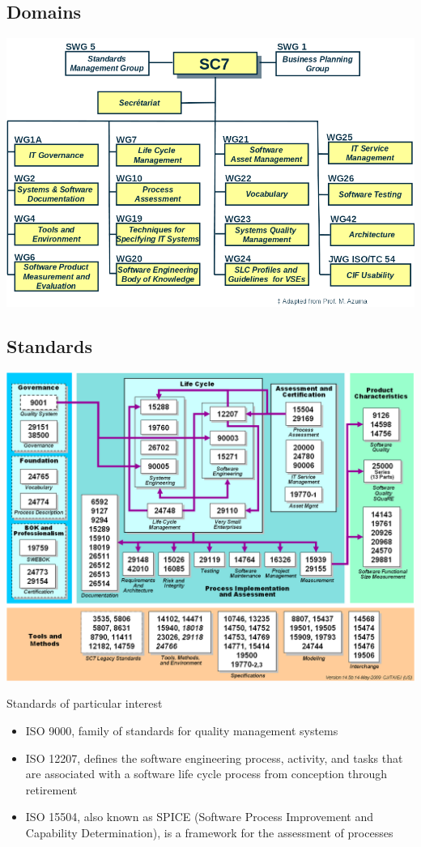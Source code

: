 \documentclass{article}[18pt]
\begin{document}
\subsection{Domains}
\begin{center}
	\includegraphics[scale=0.7]{Domains}
\end{center}
\subsection{Standards}
\begin{center}
	\includegraphics[scale=0.7]{Standards1}
\end{center}
Standards of particular interest
\begin{itemize}
	\item ISO 9000, family of standards for quality management systems
	\item ISO 12207, defines the software engineering process, activity, and tasks that are associated with a software life cycle process from conception through retirement
	\item ISO 15504, also known as SPICE (Software Process Improvement and Capability Determination), is a framework for the assessment of processes
\end{itemize}
\end{document}
